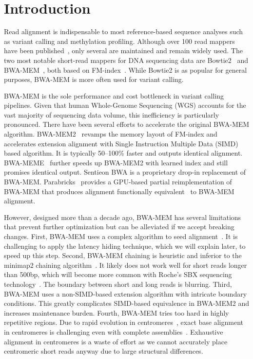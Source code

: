 \documentclass[webpdf,contemporary,large,namedate]{oup-authoring-template}%
\begin{document}
\section{Introduction}

Read alignment is indispensable to most reference-based sequence analyses such as variant calling and methylation profiling.
Although over 100 read mappers have been published~\citep{Alser:2021aa,DBLP:journals/csur/ProusalisGKNKAPSG26},
only several are maintained and remain widely used.
The two most notable short-read mappers for DNA sequencing data are Bowtie2~\citep{Langmead:2012fk} and BWA-MEM~\citep{Li:2013aa}, both based on FM-index~\citep{DBLP:conf/focs/FerraginaM00}.
While Bowtie2 is as popular for general purposes, BWA-MEM is more often used for variant calling.

BWA-MEM is the sole performance and cost bottleneck in variant calling pipelines.
Given that human Whole-Genome Sequencing (WGS) accounts for the vast majority of sequencing data volume, this inefficiency is particularly pronounced.
There have been several efforts to accelerate the original BWA-MEM algorithm.
BWA-MEM2~\citep{DBLP:conf/ipps/VasimuddinMLA19} revamps the memory layout of FM-index
and accelerates extension alignment with Single Instruction Multiple Data (SIMD) based algorithm.
It is typically 50--100\% faster and outputs identical alignment.
BWA-MEME~\citep{Jung:2022aa} further speeds up BWA-MEM2 with learned index and still promises identical output.
Sentieon BWA is a proprietary drop-in replacement of BWA-MEM.
Parabricks~\citep{OConnell:2023aa,Zhu2025.07.23.666378} provides a GPU-based partial reimplementation of BWA-MEM
that produces alignment functionally equivalent~\citep{Regier:2018aa} to BWA-MEM alignment.

However, designed more than a decade ago, BWA-MEM has several limitations that prevent further optimization but can be alleviated if we accept breaking changes.
First, BWA-MEM uses a complex algorithm to seed alignment~\citep{Li:2012fk}.
It is challenging to apply the latency hiding technique, which we will explain later, to speed up this step.
Second, BWA-MEM chaining is heuristic and inferior to the minimap2 chaining algorithm~\citep{Li:2018ab}.
It likely does not work well for short reads longer than 500bp, which will become more common with Roche's SBX sequencing technology~\citep{Kokoris2025.02.19.639056}.
The boundary between short and long reads is blurring.
Third, BWA-MEM uses a non-SIMD-based extension algorithm with intricate boundary conditions.
This greatly complicates SIMD-based equivalence in BWA-MEM2 and increases maintenance burden.
Fourth, BWA-MEM tries too hard in highly repetitive regions.
Due to rapid evolution in centromeres~\citep{Gao2025.12.09.693231}, 
exact base alignment in centromeres is challenging even with complete assemblies~\citep{Bzikadze:2022aa}.
Exhaustive alignment in centromeres is a waste of effort
as we cannot accurately place centromeric short reads anyway due to large structural differences.
\end{document}
